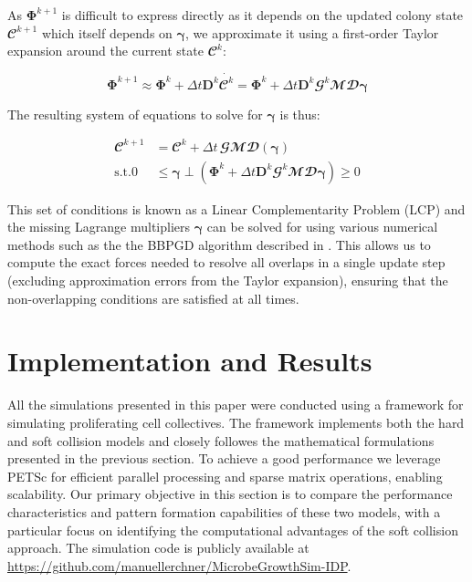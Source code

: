 \documentclass[conference]{IEEEtran}
\begin{document}
As $\mathbf{\Phi}^{k+1}$ is difficult to express directly as it depends on the updated colony state $\mathbfcal{C}^{k+1}$ which itself depends on $\mathbf{\gamma}$, we approximate it using a first-order Taylor expansion around the current state $\mathbfcal{C}^k$:

$$
    \mathbf{\Phi}^{k+1} \approx \mathbf{\Phi}^k + \Delta t \mathbf{D}^k \dot{\mathbfcal{C}^k} = \mathbf{\Phi}^k + \Delta t \mathbf{D}^k \mathbfcal{G}^k \mathbfcal{M} \mathbfcal{D} \mathbf{\gamma}
$$

The resulting system of equations to solve for $\mathbf{\gamma}$ is thus:

\begin{align}
    \mathbfcal{C}^{k+1} & = \mathbfcal{C}^k + \Delta t \, \mathbfcal{G}\mathbfcal{M} \mathbfcal{D}(\mathbf{\gamma})                                                            \\
    \text{s.t.} 0       & \leq \mathbf{\gamma} \perp \left( \mathbf{\Phi}^k + \Delta t \mathbf{D}^k \mathbfcal{G}^k \mathbfcal{M} \mathbfcal{D} \mathbf{\gamma} \right) \geq 0
\end{align}


This set of conditions is known as a Linear Complementarity Problem (LCP) and the missing Lagrange multipliers $\mathbf{\gamma}$ can be solved for using various numerical methods such as the the BBPGD algorithm described in \cite{Weady2024}. This allows us to compute the exact forces needed to resolve all overlaps in a single update step (excluding approximation errors from the Taylor expansion), ensuring that the non-overlapping conditions are satisfied at all times.




\newpage

\section{Implementation and Results}

All the simulations presented in this paper were conducted using a framework for simulating proliferating cell collectives. The framework implements both the hard and soft collision models and closely followes the mathematical formulations presented in the previous section. To achieve a good performance we leverage PETSc \cite{petsc-web-page} for efficient parallel processing and sparse matrix operations, enabling scalability. Our primary objective in this section is to compare the performance characteristics and pattern formation capabilities of these two models, with a particular focus on identifying the computational advantages of the soft collision approach. The simulation code is publicly available at {\color{blue}\url{https://github.com/manuellerchner/MicrobeGrowthSim-IDP}}.
\end{document}
